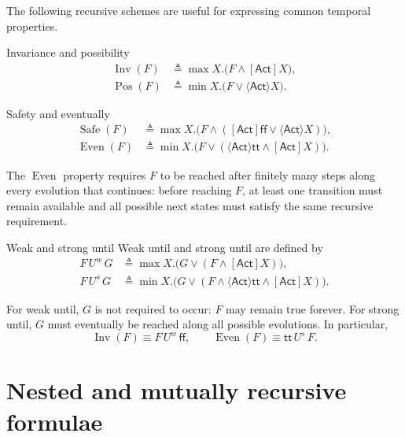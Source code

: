 \documentclass[a4paper]{article}
\newcommand{\Act}{\mathsf{Act}}
\newcommand{\ttt}{\mathsf{tt}}
\newcommand{\fff}{\mathsf{ff}}
\begin{document}
The following recursive schemes are useful for expressing common temporal properties.

\begin{snippetdefinition}{Invariance and possibility}
    \begin{align*}
        \operatorname{Inv}(F)
        &\triangleq
        \max X.\bigl(F\land[\Act]X\bigr),\\
        \operatorname{Pos}(F)
        &\triangleq
        \min X.\bigl(F\lor\langle\Act\rangle X\bigr).
    \end{align*}
\end{snippetdefinition}

\begin{snippetdefinition}{Safety and eventually}
    \begin{align*}
        \operatorname{Safe}(F)
        &\triangleq
        \max X.\bigl(F\land([\Act]\fff\lor\langle\Act\rangle X)\bigr),\\
        \operatorname{Even}(F)
        &\triangleq
        \min X.\bigl(F\lor(\langle\Act\rangle\ttt\land[\Act]X)\bigr).
    \end{align*}
\end{snippetdefinition}

The \(\operatorname{Even}\) property requires \(F\) to be reached after finitely many steps along every evolution that continues: before reaching \(F\), at least one transition must remain available and all possible next states must satisfy the same recursive requirement.

\begin{snippetdefinition}{Weak and strong until}
    Weak until and strong until are defined by
    \begin{align*}
        F\,U^{w}\,G
        &\triangleq
        \max X.\bigl(G\lor(F\land[\Act]X)\bigr),\\
        F\,U^{s}\,G
        &\triangleq
        \min X.\bigl(G\lor(F\land\langle\Act\rangle\ttt\land[\Act]X)\bigr).
    \end{align*}
\end{snippetdefinition}

For weak until, \(G\) is not required to occur: \(F\) may remain true forever.
For strong until, \(G\) must eventually be reached along all possible evolutions.
In particular,
\[
    \operatorname{Inv}(F)
    \equiv
    F\,U^w\,\fff,
    \qquad
    \operatorname{Even}(F)
    \equiv
    \ttt\,U^s\,F.
\]

\section{Nested and mutually recursive formulae}
\end{document}
